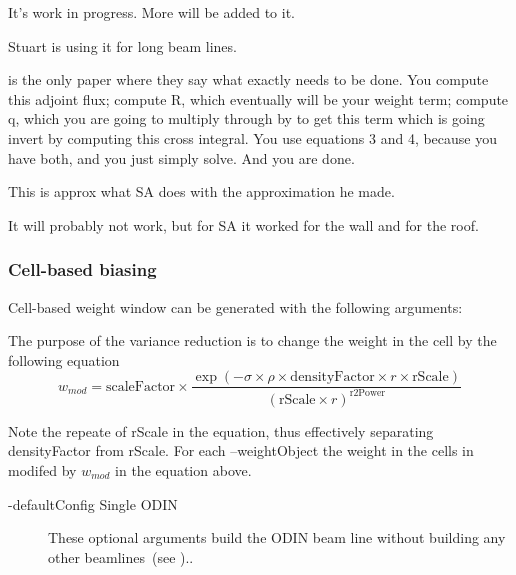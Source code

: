 \begin{description}
It's work in progress. More will be added to it.

Stuart is using it for long beam lines.




\cite{arXiv:1612.00793} is the only paper where they say what exactly needs to be done.
You compute this adjoint flux;
compute R, which eventually will be your weight term;
compute q, which you are going to multiply through by to get this term which is going invert by computing this cross integral.
You use equations 3 and 4, because you have both, and you just simply solve. And you are done.

This is approx what SA does with the approximation he made.

It will probably not work, but for SA it worked for the wall and for the roof.

\subsubsection{Cell-based biasing}
\label{sec:vr:cell}

Cell-based weight window can be generated with the following arguments:





  The purpose of the variance reduction is to change the weight in the cell by the following equation 
  \begin{equation}
    \label{weigthEqn}
    w_{mod}= \textrm{scaleFactor} \times \frac{\exp (-\sigma \times \rho \times \textrm{densityFactor}
      \times r \times \textrm{rScale}) }
    { (\textrm{rScale} \times r )^{\textrm{r2Power}} }
  \end{equation}

  Note the repeate of rScale in the equation, thus effectively separating densityFactor from rScale.
  For each --weightObject the weight in the cells in modifed by $w_{mod}$ in the equation above. 
  
  \begin{description}
\item[-defaultConfig Single ODIN ] These optional arguments build the ODIN beam line
  without building any other beamlines~(see )..


\end{description}
\end{description}
